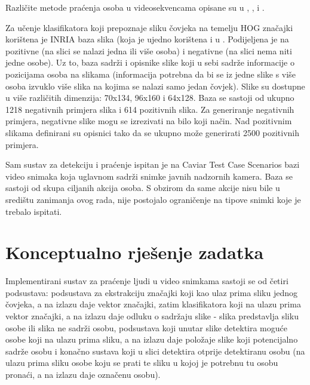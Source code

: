 \documentclass[times, utf8, seminar, numeric]{fer}
\begin{document}
Različite metode praćenja osoba u videosekvencama opisane su u \cite{object}, \cite{realtime}, \cite{efficient} i \cite{fast-accurate}.

Za učenje klasifikatora koji prepoznaje sliku čovjeka na temelju HOG značajki korištena je INRIA baza slika (koja je ujedno korištena i u \cite{hog}. Podijeljena je na pozitivne (na slici se nalazi jedna ili više osoba) i negativne (na slici nema niti jedne osobe). Uz to, baza sadrži i opisnike slike koji u sebi sadrže informacije o pozicijama osoba na slikama (informacija potrebna da bi se iz jedne slike s više osoba izvuklo više slika na kojima se nalazi samo jedan čovjek). Slike su dostupne u više različitih dimenzija: 70x134, 96x160 i 64x128. Baza se sastoji od ukupno 1218 negativnih primjera slika i 614 pozitivnih slika. Za generiranje negativnih primjera, negativne slike mogu se izrezivati na bilo koji način. Nad pozitivnim slikama definirani su opisnici tako da se ukupno može generirati 2500 pozitivnih primjera.

Sam sustav za detekciju i praćenje ispitan je na Caviar Test Case Scenarios bazi video snimaka koja uglavnom sadrži snimke javnih nadzornih kamera. Baza se sastoji od skupa ciljanih akcija osoba. S obzirom da same akcije nisu bile u središtu zanimanja ovog rada, nije postojalo ograničenje na tipove snimki koje je trebalo ispitati.

\section{Konceptualno rješenje zadatka}
Implementirani sustav za praćenje ljudi u video snimkama sastoji se od četiri podsustava: podsustava za ekstrakciju značajki koji kao ulaz prima sliku jednog čovjeka, a na izlazu daje vektor značajki, zatim klasifikatora koji  na ulazu prima vektor značajki, a na izlazu daje odluku o sadržaju slike - slika predstavlja sliku osobe ili slika ne sadrži osobu, podsustava koji unutar slike detektira moguće osobe koji na ulazu prima sliku, a na izlazu daje položaje slike koji potencijalno sadrže osobu i konačno sustava koji u slici detektira otprije detektiranu osobu (na ulazu prima sliku osobe koju se prati te sliku u kojoj je potrebnu tu osobu pronaći, a na izlazu daje označenu osobu).
\end{document}
